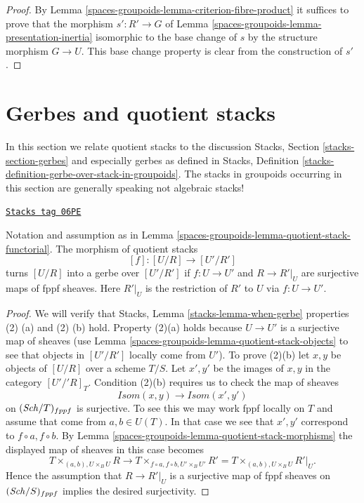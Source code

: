 \begin{proof}
By
Lemma \ref{spaces-groupoids-lemma-criterion-fibre-product}
it suffices to prove that the morphism
$s' : R' \to G$ of
Lemma \ref{spaces-groupoids-lemma-presentation-inertia}
isomorphic to the base change of $s$ by the structure
morphism $G \to U$. This base change property is
clear from the construction of $s'$.
\end{proof}

\section{Gerbes and quotient stacks}
\label{spaces-groupoids-section-gerbes}
In this section we relate quotient stacks to the discussion
Stacks, Section \ref{stacks-section-gerbes}
and especially gerbes as defined in
Stacks, Definition \ref{stacks-definition-gerbe-over-stack-in-groupoids}.
The stacks in groupoids occurring in this section
are generally speaking not algebraic stacks!

\begin{lemma}
\label{spaces-groupoids-lemma-when-gerbe}
\href{https://stacks.math.columbia.edu/tag/06PE}{\texttt{Stacks tag 06PE}}

Notation and assumption as in
Lemma \ref{spaces-groupoids-lemma-quotient-stack-functorial}.
The morphism of quotient stacks
$$
[f] : [U/R] \longrightarrow [U'/R']
$$
turns $[U/R]$ into a gerbe over $[U'/R']$ if $f : U \to U'$ and
$R \to R'|_U$ are surjective maps of fppf sheaves. Here $R'|_U$ is
the restriction of $R'$ to $U$ via $f : U \to U'$.
\end{lemma}

\begin{proof}
We will verify that
Stacks, Lemma \ref{stacks-lemma-when-gerbe}
properties (2) (a) and (2) (b) hold. Property (2)(a) holds because $U \to U'$
is a surjective map of sheaves (use
Lemma \ref{spaces-groupoids-lemma-quotient-stack-objects}
to see that objects in $[U'/R']$ locally come from $U'$).
To prove (2)(b) let $x, y$ be objects of $[U/R]$ over a scheme $T/S$.
Let $x', y'$ be the images of $x, y$ in the category $[U'/'R]_T$.
Condition (2)(b) requires us to check the map of sheaves
$$
\mathit{Isom}(x, y) \longrightarrow \mathit{Isom}(x', y')
$$
on $(\mathit{Sch}/T)_{fppf}$ is surjective. To see this we may work
fppf locally on $T$ and assume that come from $a, b \in U(T)$.
In that case we see that $x', y'$ correspond to $f \circ a, f \circ b$. By
Lemma \ref{spaces-groupoids-lemma-quotient-stack-morphisms}
the displayed map of sheaves in this case becomes
$$
T \times_{(a, b), U \times_B U} R
\longrightarrow
T \times_{f \circ a, f \circ b, U' \times_B U'} R' =
T \times_{(a, b), U \times_B U} R'|_U.
$$
Hence the assumption that $R \to R'|_U$ is a surjective map of fppf sheaves
on $(\mathit{Sch}/S)_{fppf}$ implies the desired surjectivity.
\end{proof}

